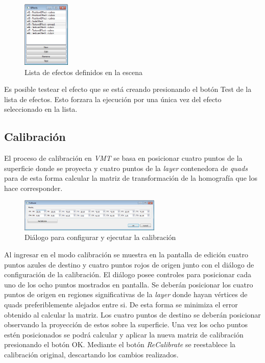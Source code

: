 \begin{figure}[H]
  \centering
    \includegraphics[width=0.2\textwidth]{./Cap5_vmt/vmt_Efects.png}
  \caption{Lista de efectos definidos en la escena}
  \label{fig:VMT-EffectList}
\end{figure}

Es posible testear el efecto que se está creando presionando el botón Test de la lista de efectos. Esto forzara la ejecución por una única vez del efecto seleccionado en la lista.

\subsection{Calibración}

El proceso de calibración en \emph{VMT} se basa en posicionar cuatro puntos de la superficie donde se proyecta y cuatro puntos de la \emph{layer} contenedora de \emph{quads} para de esta forma calcular la matriz de transformación de la homografía que los hace corresponder.

\begin{figure}[H]
  \centering
    \includegraphics[width=0.6\textwidth]{./Cap5_vmt/vmt_Calibrate.png}
  \caption{Diálogo para configurar y ejecutar la calibración}
  \label{fig:VMT-Calib}
\end{figure}

Al ingresar en el modo calibración se muestra en la pantalla de edición cuatro puntos azules de destino y cuatro puntos rojos de origen junto con el diálogo de configuración de la calibración.
El diálogo posee controles para posicionar cada uno de los ocho puntos mostrados en pantalla. Se deberán posicionar los cuatro puntos de origen en regiones significativas de la \emph{layer} donde hayan vértices de quads preferiblemente alejados entre si. De esta forma se minimiza el error obtenido al calcular la matriz.
Los cuatro puntos de destino se deberán posicionar observando la proyección de estos sobre la superficie. Una vez los ocho puntos estén posicionados se podrá calcular y aplicar la nueva matriz de calibración presionando el botón OK.
Mediante el botón \emph{ReCalibrate} se reestablece la calibración original, descartando los cambios realizados.

